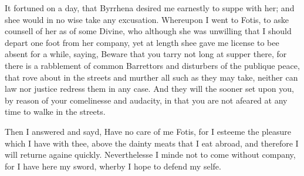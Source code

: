 It fortuned on a day, that Byrrhena desired me earnestly to suppe with her; and
shee would in no wise take any excusation. Whereupon I went to Fotis, to aske
counsell of her as of some Divine, who although she was unwilling that I should
depart one foot from her company, yet at length shee gave me license to bee
absent for a while, saying, Beware that you tarry not long at supper there, for
there is a rabblement of common Barrettors and disturbers of the publique
peace, that rove about in the streets and murther all such as they may take,
neither can law nor justice redress them in any case. And they will the sooner
set upon you, by reason of your comelinesse and audacity, in that you are not
afeared at any time to walke in the streets.

Then I answered and sayd, Have no care of me Fotis, for I esteeme the pleasure
which I have with thee, above the dainty meats that I eat abroad, and therefore
I will returne againe quickly. Neverthelesse I minde not to come without
company, for I have here my sword, wherby I hope to defend my selfe.

